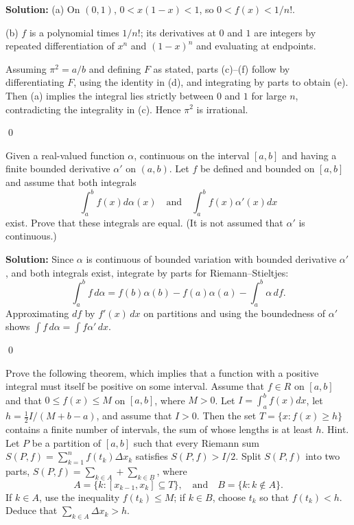 \noindent\textbf{Solution:}
(a) On $(0,1)$, $0<x(1-x)<1$, so $0<f(x)<1/n!$.

(b) $f$ is a polynomial times $1/n!$; its derivatives at $0$ and $1$ are integers by repeated differentiation of $x^n$ and $(1-x)^n$ and evaluating at endpoints.

Assuming $\pi^2=a/b$ and defining $F$ as stated, parts (c)–(f) follow by differentiating $F$, using the identity in (d), and integrating by parts to obtain (e). Then (a) implies the integral lies strictly between $0$ and $1$ for large $n$, contradicting the integrality in (c). Hence $\pi^2$ is irrational.




\qed
\begin{problembox}
Given a real-valued function $\alpha$, continuous on the interval $[a, b]$ and having a finite bounded derivative $\alpha'$ on $(a, b)$. Let $f$ be defined and bounded on $[a, b]$ and assume that both integrals
\[\int_{a}^{b} f(x) d\alpha(x) \quad \text{and} \quad \int_{a}^{b} f(x) \alpha'(x) dx\]
exist. Prove that these integrals are equal. (It is not assumed that $\alpha'$ is continuous.)
\end{problembox}

\noindent\textbf{Solution:}
Since $\alpha$ is continuous of bounded variation with bounded derivative $\alpha'$, and both integrals exist, integrate by parts for Riemann–Stieltjes:
\[\int_a^b f\,d\alpha = f(b)\alpha(b)-f(a)\alpha(a)-\int_a^b \alpha\,df.
\]
Approximating $df$ by $f'(x)\,dx$ on partitions and using the boundedness of $\alpha'$ shows $\int f\,d\alpha=\int f\alpha'\,dx$.




\qed
\begin{problembox}
Prove the following theorem, which implies that a function with a positive integral must itself be positive on some interval. Assume that $f \in R$ on $[a, b]$ and that $0 \leq f(x) \leq M$ on $[a, b]$, where $M > 0$. Let $I = \int_{a}^{b} f(x) dx$, let $h = \frac{1}{2} I/(M + b - a)$, and assume that $I > 0$. Then the set $T = \{ x : f(x) \geq h \}$ contains a finite number of intervals, the sum of whose lengths is at least $h$. Hint. Let $P$ be a partition of $[a, b]$ such that every Riemann sum $S(P, f) = \sum_{k=1}^{n} f(t_k) \Delta x_k$ satisfies $S(P, f) > I/2$. Split $S(P, f)$ into two parts, $S(P, f) = \sum_{k \in A} + \sum_{k \in B}$, where
\[A = \{ k : [x_{k-1}, x_k] \subseteq T \}, \quad \text{and} \quad B = \{ k : k \notin A \}.\]
If $k \in A$, use the inequality $f(t_k) \leq M$; if $k \in B$, choose $t_k$ so that $f(t_k) < h$. Deduce that $\sum_{k \in A} \Delta x_k > h$.
\end{problembox}

